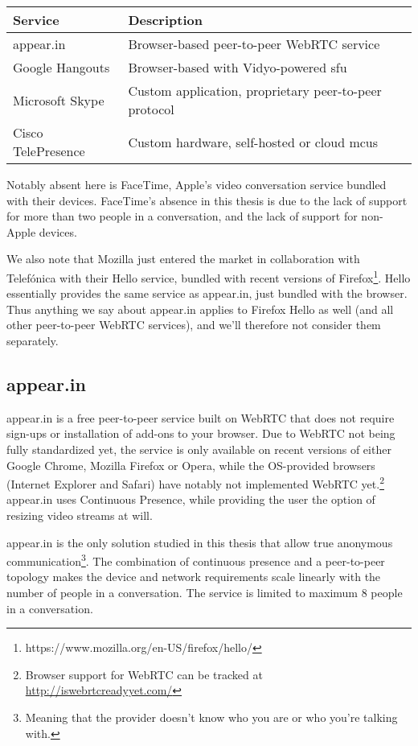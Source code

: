 \begin{center}
	\label{tab:existing-solutions}
	\begin{tabular}{| l | l |}
		\hline
		\textbf{Service} & \textbf{Description} \\ \hline
		appear.in & Browser-based peer-to-peer WebRTC service \\ \hline
		Google Hangouts & Browser-based with Vidyo-powered \gls{sfu} \\ \hline
		Microsoft Skype & Custom application, proprietary peer-to-peer protocol \\ \hline
		Cisco TelePresence & Custom hardware, self-hosted or cloud \glspl{mcu} \\ \hline
	\end{tabular}
\end{center}

Notably absent here is FaceTime, Apple's video conversation service bundled with their devices. FaceTime's absence in this thesis is due to the lack of support for more than two people in a conversation, and the lack of support for non-Apple devices.

We also note that Mozilla just entered the market in collaboration with Telefónica with their Hello service, bundled with recent versions of Firefox\footnote{https://www.mozilla.org/en-US/firefox/hello/}. Hello essentially provides the same service as appear.in, just bundled with the browser. Thus anything we say about appear.in applies to Firefox Hello as well (and all other peer-to-peer WebRTC services), and we'll therefore not consider them separately.

\subsection{appear.in}

appear.in is a free peer-to-peer service built on WebRTC that does not require sign-ups or installation of add-ons to your browser. Due to WebRTC not being fully standardized yet, the service is only available on recent versions of either Google Chrome, Mozilla Firefox or Opera, while the OS-provided browsers (Internet Explorer and Safari) have notably not implemented WebRTC yet.\footnote{Browser support for WebRTC can be tracked at \url{http://iswebrtcreadyyet.com/}} appear.in uses Continuous Presence, while providing the user the option of resizing video streams at will.

appear.in is the only solution studied in this thesis that allow true anonymous communication\footnote{Meaning that the provider doesn't know who you are or who you're talking with.}. The combination of continuous presence and a peer-to-peer topology makes the device and network requirements scale linearly with the number of people in a conversation. The service is limited to maximum 8 people in a conversation.


